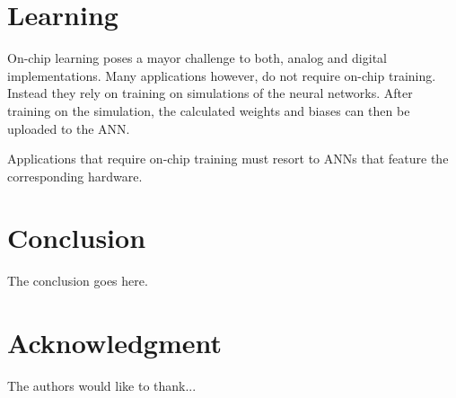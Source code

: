 \documentclass[conference]{IEEEtran}
\begin{document}
    \section{Learning}

    On-chip learning poses a mayor challenge to both, analog and digital implementations.
    Many applications however, do not require on-chip training.
    Instead they rely on training on simulations of the neural networks.
    After training on the simulation, the calculated weights and biases can then be uploaded to the ANN\@.

    Applications that require on-chip training must resort to ANNs that feature the corresponding hardware.

    \section{Conclusion}
    The conclusion goes here.







    \section*{Acknowledgment}


    The authors would like to thank...








    \medskip

    
    


\end{document}
